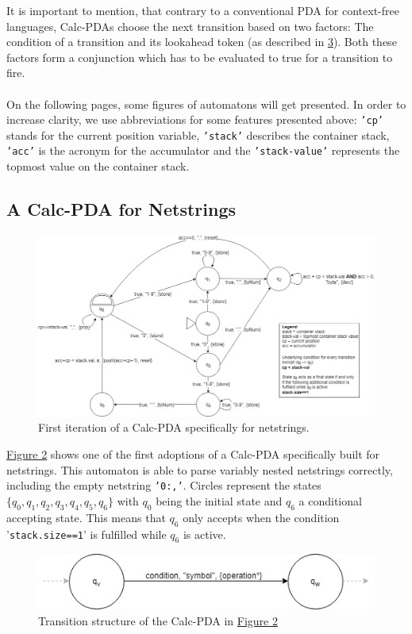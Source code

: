 It is important to mention, that contrary to a conventional PDA for context-free languages, Calc-PDAs choose the next transition based on two factors: The condition of a transition and its lookahead token (as described in \hyperref[3.1]{3}). Both these factors form a conjunction which has to be evaluated to true for a transition to fire.\\\\
On the following pages, some figures of automatons will get presented. In order to increase clarity, we use abbreviations for some features presented above: \texttt{'cp'} stands for the current position variable, \texttt{'stack'} describes the container stack, \texttt{'acc'} is the acronym for the accumulator and the \texttt{'stack-value'} represents the topmost value on the container stack. 
\subsection{A Calc-PDA for Netstrings}
\label{4.3}
\begin{figure}
    \centering
    \includegraphics[width=\linewidth]{fig/Calc-PDA-netstrings-version_8.png}
    \caption{First iteration of a Calc-PDA specifically for netstrings.}
    \label{fig:fig-2-netstring-Calc-pda-1}
\end{figure}\hyperref[fig:fig-2-netstring-Calc-pda-1]{Figure 2} shows one of the first adoptions of a Calc-PDA specifically built for netstrings. This automaton is able to parse variably nested netstrings correctly, including the empty netstring \texttt{'0:,'}. Circles represent the states $\{q_0, q_1, q_2, q_3, q_4, q_5, q_6\}$ with $q_0$ being the initial state and $q_6$ a conditional accepting state. This means that $q_6$ only accepts when the condition '\texttt{stack.size==1}' is fulfilled while $q_6$ is active.
\begin{figure}
    \centering
    \includegraphics[width=0.8\linewidth]{fig/transitions-netstring-version_8.png}
    \caption{Transition structure of the Calc-PDA in \hyperref[fig:fig-2-netstring-Calc-pda-1]{Figure 2}}
    \label{fig:fig-3-transition-netstring-Calc-pda-1}
\end{figure}
